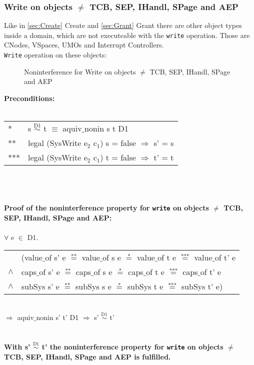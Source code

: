 \subsubsection{Write on objects $\neq$ TCB, SEP, IHandl, SPage and AEP}\label{WriteOthers}
Like in \ref{sec:Create} Create and \ref{sec:Grant} Grant there are other object types inside a domain, which are not executeable with the \texttt{write} operation. Those are CNodes, VSpaces, UMOs and Interrupt Controllers. \\
\texttt{Write} operation on these objects: \\
\begin{flushleft}
\begin{figure}[H]
\caption{Noninterference for Write on objects $\neq$ TCB, SEP, IHandl, SPage and AEP}
\end{figure}
\end{flushleft}
\textbf{Preconditions:} \\ \\
\begin{tabular}{ll}
* & s $\overset{\text{D1}}{\sim}$ t $\equiv$ aquiv$\_$nonin s t D1	\\ 
** & legal (SysWrite e$_2$ c$_1$) s = false $\Rightarrow$ s' = s \\ 
*** & legal (SysWrite e$_2$ c$_1$) t = false $\Rightarrow$ t' = t
\end{tabular} \\ \\ \\
\textbf{Proof of the noninterference property for \texttt{write} on objects $\neq$ TCB, SEP, IHandl, SPage and AEP:}\\ \\
$\forall$ e $\in$ D1. \\ 
\begin{tabular}{ll}
& (value$\_$of s' e $\overset{\text{**}}{=}$ value$\_$of s e $\overset{\text{*}}{=}$ value$\_$of t e $\overset{\text{***}}{=}$ value$\_$of t' e \\
$\wedge$ & caps$\_$of s' e $\overset{\text{**}}{=}$ caps$\_$of s e $\overset{\text{*}}{=}$ caps$\_$of t e $\overset{\text{***}}{=}$ caps$\_$of t' e \\
$\wedge$ & subSys s' e $\overset{\text{**}}{=}$ subSys s e $\overset{\text{*}}{=}$ subSys t e $\overset{\text{***}}{=}$ subSys t' e)
\end{tabular} \\
$\Rightarrow$ aquiv$\_$nonin s' t' D1 $\Rightarrow$ s' $\overset{\text{D1}}{\sim}$ t' \\ \\ \\
\textbf{With s' $\overset{\text{D1}}{\sim}$ t' the noninterference property for \texttt{write} on objects $\neq$ TCB, SEP, IHandl, SPage and AEP is fulfilled.} 
\clearpage
